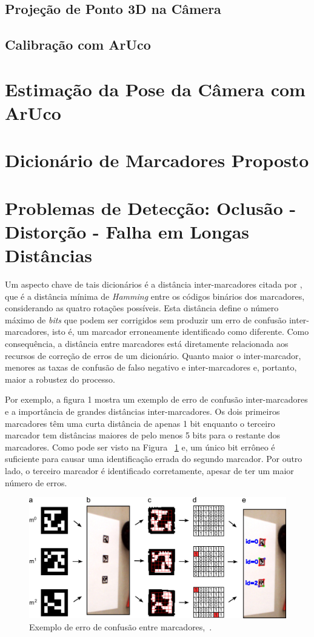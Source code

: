 \subsection{Projeção de Ponto 3D na Câmera}

\subsection{Calibração com ArUco}

\section{Estimação da Pose da Câmera com ArUco}

\section{Dicionário de Marcadores Proposto}

\section{Problemas de Detecção: Oclusão - Distorção - Falha em Longas Distâncias}

Um aspecto chave de tais dicionários é a distância inter-marcadores citada por \citet{Fiala2010}, que é a distância mínima de \textit{Hamming} entre os códigos binários dos marcadores, considerando as quatro rotações possíveis. Esta distância define o número máximo de \textit{bits} que podem ser corrigidos sem produzir um erro de confusão inter-marcadores, isto é, um marcador erroneamente identificado como diferente. Como consequência, a distância entre marcadores está diretamente relacionada aos recursos de correção de erros de um dicionário. Quanto maior o inter-marcador, menores as taxas de confusão de falso negativo e inter-marcadores e, portanto, maior a robustez do processo.

Por exemplo, a figura 1 mostra um exemplo de erro de confusão inter-marcadores e a importância de grandes distâncias inter-marcadores. Os dois primeiros marcadores têm uma curta distância de apenas 1 bit enquanto o terceiro marcador tem distâncias maiores de pelo menos 5  bits para o restante dos marcadores. Como pode ser visto na Figura ~\ref{fig:aruco-definicao} e, um único bit errôneo é suficiente para causar uma identificação errada do segundo marcador. Por outro lado, o terceiro marcador é identificado corretamente, apesar de ter um maior número de erros.

\begin{figure}[h]
	\centering
	\includegraphics[width=14cm, height=6 cm]{figuras/arucofig1.jpg}
	\caption{Exemplo de erro de confusão entre marcadores,~\citet{Ramirez2018}.}
	\label{fig:aruco-definicao}
\end{figure}